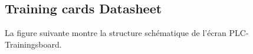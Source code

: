 \documentclass[a4paper,12pt]{report}
\begin{document}
\subsection{Training cards Datasheet}
La figure suivante montre la structure schématique de l’écran PLC-Trainingsboard.
\begin{center}
\label{}
\end{center}
\end{document}
